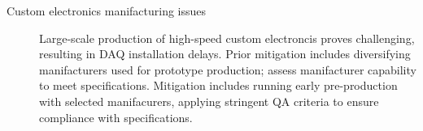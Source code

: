 \begin{description}
\item[Custom electronics manifacturing issues] Large-scale production of high-speed custom
  electroncis proves challenging, resulting in DAQ installation delays. Prior mitigation includes diversifying manifacturers used for prototype production; assess manifacturer capability to meet specifications.  Mitigation includes running early pre-production with selected manifacurers, applying stringent QA criteria to ensure compliance with specifications.

\end{description}
